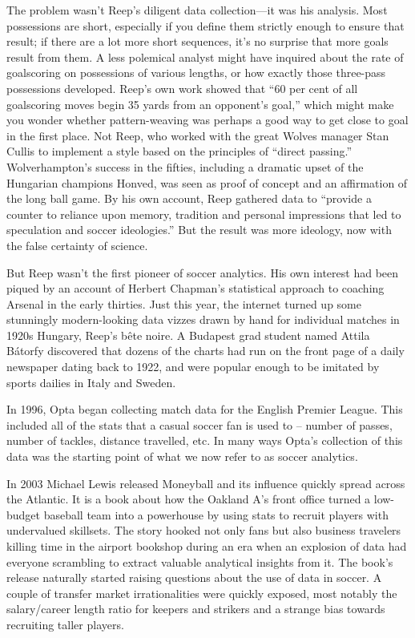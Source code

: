 The problem wasn’t Reep’s diligent data collection—it was his analysis. Most 
possessions are short, especially if you define them strictly enough to 
ensure that result; if there are a lot more short sequences, it’s no 
surprise that more goals result from them. A less polemical analyst 
might have inquired about the rate of goalscoring on possessions of various 
lengths, or how exactly those three-pass possessions developed. Reep’s own 
work showed that “60 per cent of all goalscoring moves begin 35 yards from 
an opponent’s goal,” which might make you wonder whether pattern-weaving was 
perhaps a good way to get close to goal in the first place. Not Reep, who 
worked with the great Wolves manager Stan Cullis to implement a style based 
on the principles of “direct passing.” Wolverhampton’s 
success in the fifties, including a dramatic upset of the Hungarian 
champions Honved, was seen as proof of concept and an affirmation of the 
long ball game. By his own account, Reep gathered data to “provide a 
counter to reliance upon memory, tradition and personal impressions 
that led to speculation and soccer ideologies.” But the result was 
more ideology, now with the false certainty of science.

But Reep wasn’t the first pioneer of 
soccer analytics. His own interest had been piqued by an account of Herbert 
Chapman’s statistical approach to coaching Arsenal in the early thirties. 
Just this year, the internet turned up some stunningly modern-looking 
data vizzes drawn by hand for individual matches in 1920s Hungary, Reep’s 
bête noire. A Budapest grad student named Attila Bátorfy discovered that 
dozens of the charts had run on the front page of a daily newspaper dating 
back to 1922, and were popular enough to be imitated by sports dailies in 
Italy and Sweden.

In 1996, Opta began collecting match data for the English Premier League. 
This included all of the stats that a casual soccer fan is used to – number 
of passes, number of tackles, distance travelled, etc. In many ways Opta’s 
collection of this data was the starting point of what we now refer to as 
soccer analytics.

In 2003 Michael Lewis released Moneyball and its influence quickly spread 
across the Atlantic. It is a book about how the Oakland A’s front office turned a 
low-budget baseball team into a powerhouse by using stats to recruit 
players with undervalued skillsets. The story hooked not only fans 
but also business travelers killing time in the airport bookshop 
during an era when an explosion of data had everyone scrambling to 
extract valuable analytical insights from it. The book’s release naturally started raising questions 
about the use of data in soccer. A couple of transfer market irrationalities 
were quickly exposed, most notably the salary/career length ratio for keepers 
and strikers and a strange bias towards recruiting taller players.

